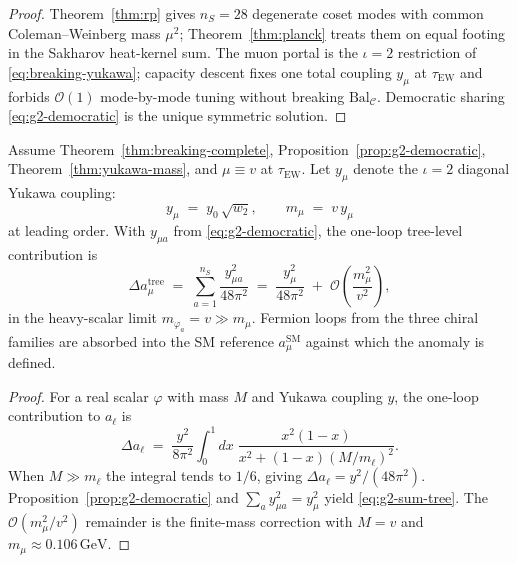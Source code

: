 \begin{proof}
Theorem~\ref{thm:rp} gives $n_S=28$ degenerate coset modes with common
Coleman--Weinberg mass $\mu^2$; Theorem~\ref{thm:planck} treats them on equal
footing in the Sakharov heat-kernel sum. The muon portal is the
$\iota=2$ restriction of \eqref{eq:breaking-yukawa}; capacity descent fixes
one total coupling $y_\mu$ at $\tau_{\mathrm{EW}}$ and forbids
$\mathcal{O}(1)$ mode-by-mode tuning without breaking
$\mathrm{Bal}_{\mathcal{C}}$. Democratic sharing
\eqref{eq:g2-democratic} is the unique symmetric solution.
\end{proof}

\begin{theorem}\label{thm:g2-oneloop}
Assume Theorem~\ref{thm:breaking-complete}, Proposition~\ref{prop:g2-democratic},
Theorem~\ref{thm:yukawa-mass}, and $\mu\equiv v$ at $\tau_{\mathrm{EW}}$.
Let $y_\mu$ denote the $\iota=2$ diagonal Yukawa coupling:
\begin{equation}\label{eq:ymu-def}
  y_\mu \;=\; y_0\,\sqrt{w_2},
  \qquad
  m_\mu \;=\; v\,y_\mu
\end{equation}
at leading order. With $y_{\mu a}$ from \eqref{eq:g2-democratic}, the
one-loop tree-level contribution is
\begin{equation}\label{eq:g2-sum-tree}
  \Delta a_\mu^{\mathrm{tree}}
  \;=\;
  \sum_{a=1}^{n_S}
  \frac{y_{\mu a}^2}{48\pi^2}
  \;=\;
  \frac{y_\mu^2}{48\pi^2}
  \;+\;
  \mathcal{O}\!\left(\frac{m_\mu^2}{v^2}\right),
\end{equation}
in the heavy-scalar limit $m_{\varphi_a}=v\gg m_\mu$. Fermion loops from the
three chiral families are absorbed into the SM reference
$a_\mu^{\mathrm{SM}}$ against which the anomaly is defined.
\end{theorem}

\begin{proof}
For a real scalar $\varphi$ with mass $M$ and Yukawa coupling $y$, the
one-loop contribution to $a_\ell$ is~\cite{Leveille1978}
\begin{equation}\label{eq:g2-integral}
  \Delta a_\ell
  \;=\;
  \frac{y^2}{8\pi^2}
  \int_0^1\!dx\;
  \frac{x^2(1-x)}{x^2+(1-x)(M/m_\ell)^2}.
\end{equation}
When $M\gg m_\ell$ the integral tends to $1/6$, giving
$\Delta a_\ell=y^2/(48\pi^2)$. Proposition~\ref{prop:g2-democratic} and
$\sum_a y_{\mu a}^2=y_\mu^2$ yield \eqref{eq:g2-sum-tree}. The
$\mathcal{O}(m_\mu^2/v^2)$ remainder is the finite-mass correction with
$M=v$ and $m_\mu\approx0.106\,\mathrm{GeV}$.
\end{proof}

